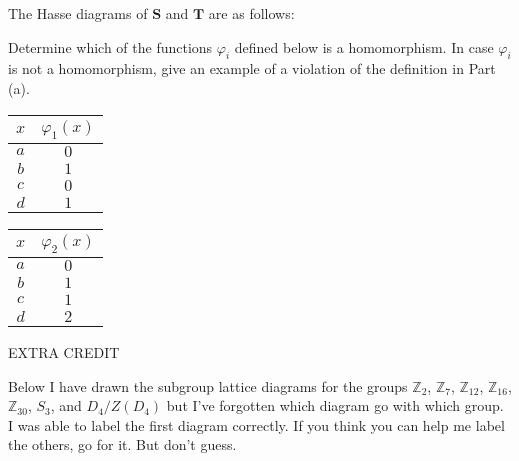 \documentclass[fleqn,12pt]{article}
\newcommand{\<}{\ensuremath{\langle}}
\renewcommand{\>}{\ensuremath{\rangle}}
\newcommand{\Z}{\ensuremath{\mathbb{Z}}}
\newcommand{\bS}{\ensuremath{\mathbf{S}}}
\newcommand{\bT}{\ensuremath{\mathbf{T}}}
\begin{document}
\begin{enumerate}[{\bf 1.}]
\begin{enumerate}
\medskip
The Hasse diagrams of $\bS$ and $\bT$ are as follows:
\begin{center}
  
\end{center}

Determine which of the functions $\varphi_i$ defined below is a homomorphism.
In case $\varphi_i$ is not a homomorphism, give an example of 
a violation of the definition in Part (a).

\medskip
\begin{center}
\begin{tabular}{c|c}
  $x$ & $\varphi_1(x)$ \\
\hline
  $a$ & $0$\\\hline
  $b$ & $1$\\\hline
  $c$ & $0$\\\hline
  $d$ & $1$
\end{tabular}
\hskip3cm
\begin{tabular}{c|c}
  $x$ & $\varphi_2(x)$ \\
\hline
  $a$ & $0$\\\hline
  $b$ & $1$\\\hline
  $c$ & $1$\\\hline
  $d$ & $2$
\end{tabular}
\end{center}

\end{enumerate}
  \end{enumerate}
\newpage
\begin{center}
  EXTRA CREDIT
\end{center}
Below I have drawn the subgroup lattice diagrams for the groups $\Z_2$,
$\Z_7$, $\Z_{12}$, $\Z_{16}$, $\Z_{30}$, $S_3$, and  $D_4/Z(D_4)$ but I've
forgotten which diagram go with which group.  I was able to label the first
diagram correctly.  If you think you can help me label the others, go for
it. But don't guess. 
\end{document}
